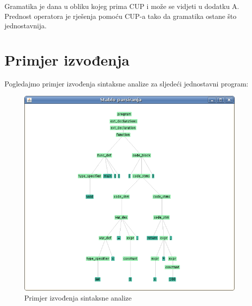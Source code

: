 Gramatika je dana u obliku kojeg prima CUP i može se vidjeti u dodatku A. Prednost operatora je rješenja pomoću CUP-a tako
da gramatika ostane što jednostavnija.

\section{Primjer izvođenja}
Pogledajmo primjer izvođenja sintaksne analize za sljedeći jednostavni program:



\begin{figure}[H]
  \centering
    \includegraphics[width=13cm]{primjer-sintaksna1}
  \caption{Primjer izvođenja sintaksne analize}
\label{komponente}
\end{figure}
